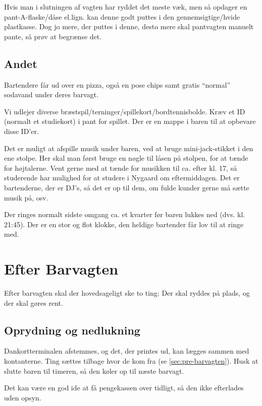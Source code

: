 Hvis man i slutningen af vagten har ryddet det meste væk, men så
opdager en pant-A-flaske/dåse el.lign. kan denne godt puttes i den
gennemsigtige/hvide plastkasse. Dog jo mere, der puttes i denne, desto
mere skal pantvagten manuelt pante, så prøv at begrænse det.

\subsection{Andet}
\label{sec:intra:andet}

Bartendere får ud over en pizza, også en pose chips samt gratis
``normal'' sodavand under deres barvagt.

Vi udlejer diverse
bræstspil/terninger/spillekort/bordtennisbolde. Kræv et ID (normalt et
studiekort) i pant for spillet. Der er en mappe i baren til at
opbevare disse ID'er.

Det er muligt at afspille musik under baren, ved at bruge
mini-jack-stikket i den ene stolpe. Her skal man først bruge en nøgle
til låsen på stolpen, for at tænde for højtalerne. Vent gerne med at
tænde for musikken til ca. efter kl. 17, så studerende har mulighed
for at studere i Nygaard om eftermiddagen. Det er bartenderne, der er
DJ's, så det er op til dem, om fulde kunder gerne må sætte musik på,
osv.

Der ringes normalt sidste omgang ca. et kvarter før baren lukkes ned
(dvs. kl. 21:45). Der er en stor og flot klokke, den heldige bartender
får lov til at ringe med.

\section{Efter Barvagten}
\label{sec:post-barvagten}

Efter barvagten skal der hovedsageligt ske to ting: Der skal ryddes på
plads, og der skal gøres rent.

\subsection{Oprydning og nedlukning}
\label{sec:post:oprydning}

Dankortterminalen afstemmes, og det, der printes ud, kan lægges sammen
med kontanterne. Ting sættes tilbage hvor de kom fra (se
\autoref{sec:pre-barvagten}). Husk at slutte baren til timeren, så den
køler op til næste barvagt.

 Det kan være en god ide at få
pengekassen over tidligt, så den ikke efterlades uden opsyn.

